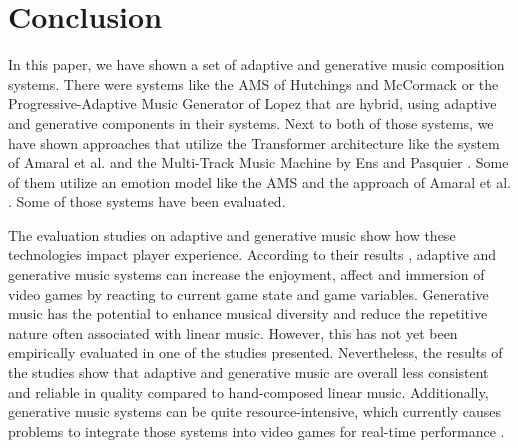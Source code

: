 \section{Conclusion}

In this paper, we have shown a set of adaptive and generative
music composition systems. There were systems like the AMS of Hutchings and McCormack
\cite{hutMcCormAms} or the Progressive-Adaptive Music Generator
of Lopez \cite{lopez2023progressive} that are hybrid, using 
adaptive and generative components in their systems. Next to both of those systems, we have shown approaches that utilize the Transformer architecture like the system of Amaral et al.
\cite{amaral2022adaptive} and the Multi-Track Music Machine by 
Ens and Pasquier \cite{ens2020mmm}. Some of them utilize an
emotion model like the AMS \cite{hutMcCormAms} and the approach
of Amaral et al. \cite{amaral2022adaptive}. Some of those
systems have been evaluated.

The evaluation studies on adaptive and generative music show how these technologies impact player experience. According to their results \cite{hutMcCormAms} \cite{plut2019music} \cite{plut2022preglam}, adaptive and generative music systems can increase the enjoyment, affect and immersion of video games by reacting to current game state and game variables. Generative music has the potential to enhance musical diversity and reduce the repetitive nature often associated with linear music. However, this has not yet been empirically evaluated in one of the studies presented.
Nevertheless, the results of the studies show that adaptive and generative music are overall less consistent and reliable in quality compared to hand-composed linear music. Additionally, generative music systems can be quite resource-intensive, which currently causes problems to integrate those systems into video games for real-time performance \cite{plut2022preglam}.
